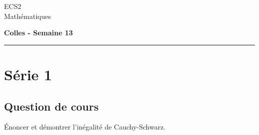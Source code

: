 \documentclass[11pt]{article}%
\begin{document}
\begin{flushleft}
ECS2 \\
Mathématiques
\end{flushleft}

\begin{center}
\textbf{\Large{Colles - Semaine 13}}
\end{center}

\hrule

\vspace*{0,2cm}

\section*{Série 1}
\subsection*{Question de cours}
\noindent
Énoncer et démontrer l'inégalité de Cauchy-Schwarz.
\end{document}
